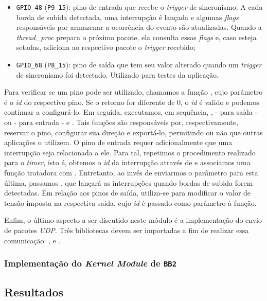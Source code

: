 \begin{itemize} \renewcommand\labelitemi{--}
  \item \texttt{GPIO\_48} (\texttt{P9\_15}): pino de entrada que recebe o
  \textit{trigger} de sincronismo. A cada borda de subida detectada, uma
  interrupção é lançada e algumas \textit{flags} responsáveis por armazenar a
  ocorrência do evento são atualizadas. Quando a \textit{thread\_proc} prepara o
  próximo pacote, ela consulta essas \textit{flags} e, caso esteja setadas,
  adiciona ao respectivo pacote o \textit{trigger} recebido;

  \item \texttt{GPIO\_68} (\texttt{P8\_15}): pino de saída que tem seu valor
  alterado quando um \textit{trigger} de sincronismo foi detectado. Utilizado
  para testes da aplicação.
\end{itemize}

Para verificar se um pino pode ser utilizado, chamamos a função
, cujo parâmetro é o \textit{id} do respectivo pino. Se o
retorno for diferente de 0, o \textit{id} é valido e podemos continuar a
configurá-lo. Em seguida, executamos, em sequência,
,  - para saída - ou
 - para entrada - e . Tais
funções são responsáveis por, respectivamente, reservar o pino, configurar sua
direção e exportá-lo, permitindo ou não que outras aplicações o utilizem. O pino
de entrada requer adicionalmente que uma interrupção seja relacionada a ele.
Para tal, repetimos o procedimento realizado para o \textit{timer}, isto é,
obtemos o \textit{id} da interrupção através de  e associamos
uma função tratadora com . Entretanto, ao invés de enviarmos
o parâmetro  para esta última, passamos
, que lançará as interrupções quando bordas de subida
forem detectadas. Em relação aos pinos de saída, utiliza-se 
 para modificar o valor de tensão imposta na respectiva
saída, cujo \textit{id} é passado como parâmetro à função.

\vspace{12pt}

Enfim, o último aspecto a ser discutido neste módulo é a implementação do envio
de pacotes \textit{UDP}. Três bibliotecas devem ser importadas a fim de
realizar essa comunicação: ,  e
.

\subsubsection{Implementação do \textit{Kernel Module} de \texttt{BB2}}

\subsection {Resultados}




